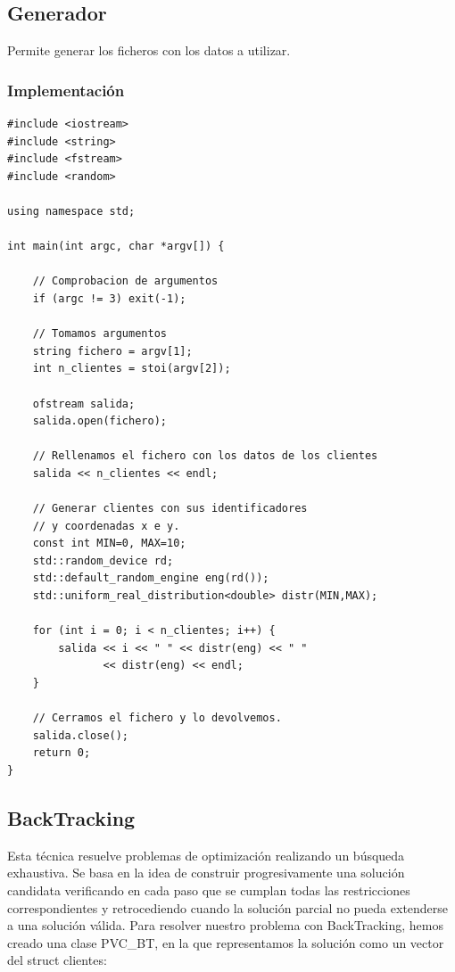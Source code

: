 \documentclass[a4paper,12pt,twoside]{article} %
\begin{document}
\subsection{Generador}

Permite generar los ficheros con los datos a utilizar.\\

\subsubsection{Implementación}
\lstset{language=C++}
\begin{lstlisting}
#include <iostream>
#include <string>
#include <fstream>
#include <random>

using namespace std;

int main(int argc, char *argv[]) {

    // Comprobacion de argumentos
    if (argc != 3) exit(-1);

    // Tomamos argumentos
    string fichero = argv[1];
    int n_clientes = stoi(argv[2]);

    ofstream salida;
    salida.open(fichero);

    // Rellenamos el fichero con los datos de los clientes
    salida << n_clientes << endl;

    // Generar clientes con sus identificadores 
    // y coordenadas x e y.
    const int MIN=0, MAX=10;
    std::random_device rd;
    std::default_random_engine eng(rd());
    std::uniform_real_distribution<double> distr(MIN,MAX);

    for (int i = 0; i < n_clientes; i++) {
        salida << i << " " << distr(eng) << " " 
               << distr(eng) << endl;
    }

    // Cerramos el fichero y lo devolvemos.
    salida.close();
    return 0;
}

\end{lstlisting}


\subsection{BackTracking}
Esta técnica resuelve problemas de optimización realizando un búsqueda exhaustiva. Se basa en la idea de construir progresivamente una solución candidata verificando en cada paso que se cumplan todas las restricciones correspondientes y retrocediendo cuando la solución parcial no pueda extenderse a una solución válida.
Para resolver nuestro problema con BackTracking, hemos creado una clase PVC\_BT, en la que representamos la solución como un vector del struct clientes:\\
\end{document}
